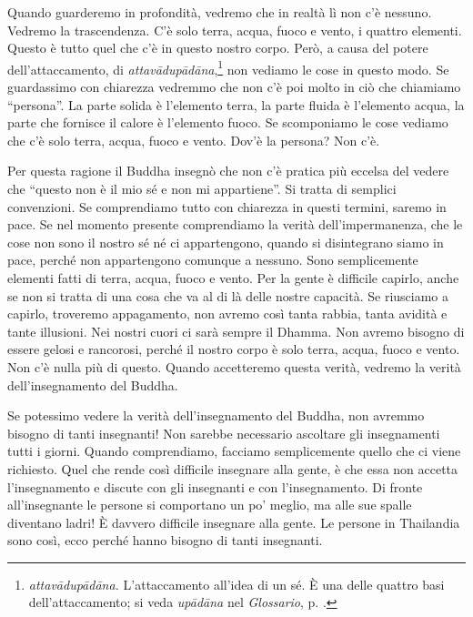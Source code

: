 Quando guarderemo in profondità, vedremo che in realtà lì
non c'è nessuno. Vedremo la trascendenza. C'è solo terra, acqua, fuoco e
vento, i quattro elementi. Questo è tutto quel che c'è in questo nostro
corpo. Però, a causa del potere dell'attaccamento, di
\emph{attavādupādāna},\footnote{\emph{attavādupādāna.} L'attaccamento
  all'idea di un sé. È una delle quattro basi dell'attaccamento; si
  veda \emph{upādāna} nel \emph{Glossario}, p. \pageref{glossary-upadana}.} non vediamo le cose in
questo modo. Se guardassimo con chiarezza vedremmo che non c'è poi molto
in ciò che chiamiamo ``persona''. La parte solida è l'elemento terra, la
parte fluida è l'elemento acqua, la parte che fornisce il calore è
l'elemento fuoco. Se scomponiamo le cose vediamo che c'è solo terra,
acqua, fuoco e vento. Dov'è la persona? Non c'è.

Per questa ragione il Buddha insegnò che non c'è pratica più eccelsa del
vedere che ``questo non è il mio sé e non mi appartiene''. Si tratta di
semplici convenzioni. Se comprendiamo tutto con chiarezza in questi
termini, saremo in pace. Se nel momento presente comprendiamo la verità
dell'impermanenza, che le cose non sono il nostro sé né ci appartengono,
quando si disintegrano siamo in pace, perché non appartengono comunque a
nessuno. Sono semplicemente elementi fatti di terra, acqua, fuoco e
vento. Per la gente è difficile capirlo, anche se non si tratta di una
cosa che va al di là delle nostre capacità. Se riusciamo a capirlo,
troveremo appagamento, non avremo così tanta rabbia, tanta avidità e
tante illusioni. Nei nostri cuori ci sarà sempre il Dhamma. Non avremo
bisogno di essere gelosi e rancorosi, perché il nostro corpo è solo
terra, acqua, fuoco e vento. Non c'è nulla più di questo. Quando
accetteremo questa verità, vedremo la verità dell'insegnamento del
Buddha.

Se potessimo vedere la verità dell'insegnamento del Buddha, non avremmo
bisogno di tanti insegnanti! Non sarebbe necessario ascoltare gli
insegnamenti tutti i giorni. Quando comprendiamo, facciamo semplicemente
quello che ci viene richiesto. Quel che rende così difficile insegnare
alla gente, è che essa non accetta l'insegnamento e discute con gli
insegnanti e con l'insegnamento. Di fronte all'insegnante le persone si
comportano un po' meglio, ma alle sue spalle diventano ladri! È davvero
difficile insegnare alla gente. Le persone in Thailandia sono così, ecco
perché hanno bisogno di tanti insegnanti.

